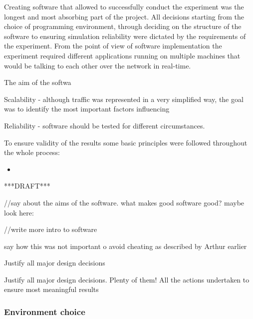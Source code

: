 \documentclass[11pt,english]{article}
\begin{document}
Creating software that allowed to successfully conduct the experiment was the longest and most absorbing part of the project. All decisions starting from the choice of programming environment, through deciding on the structure of the software to ensuring simulation reliability were dictated by the requirements of the experiment. From the point of view of software implementation the experiment required different applications running on multiple machines that would be talking to each other over the network in real-time.


The aim of the softwa

Scalability - although traffic was represented in a very simplified way, the goal was to identify the most important factors influencing 

Reliability - software should be tested for different circumstances. 

To ensure validity of the results some basic principles were followed throughout the whole process:
\begin{itemize}
\item 
\end{itemize}


***DRAFT***

//say about the aims of the software. what makes good software good? maybe look here:



//write more intro to software



say how this was not important o avoid cheating as described by Arthur earlier



Justify all major design decisions

Justify all major design decisions. Plenty of them!
All the actions undertaken to ensure most meaningful results


\subsubsection{Environment choice}
\end{document}
